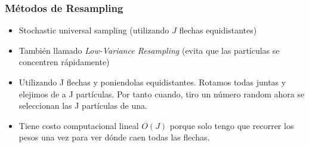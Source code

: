 \begin{frame}
    \frametitle{Métodos de Resampling}

    \footnotesize

    \begin{overlayarea}{\textwidth}{\textheight}

        \begin{itemize}
            \item Stochastic universal sampling (utilizando $J$ flechas equidistantes)
            \item También llamado \emph{Low-Variance Resampling} (evita que las partículas se concentren rápidamente)
            \item Utilizando J flechas y poniendolas equidistantes. Rotamos todas juntas y elejimos de a J partículas. Por tanto cuando, tiro un número random ahora se seleccionan las J partículas de una.
            \item Tiene costo computacional lineal $O(J)$ porque solo tengo que recorrer los pesos una vez para ver dónde caen todas las flechas.
        \end{itemize}

    \end{overlayarea}
\end{frame}

